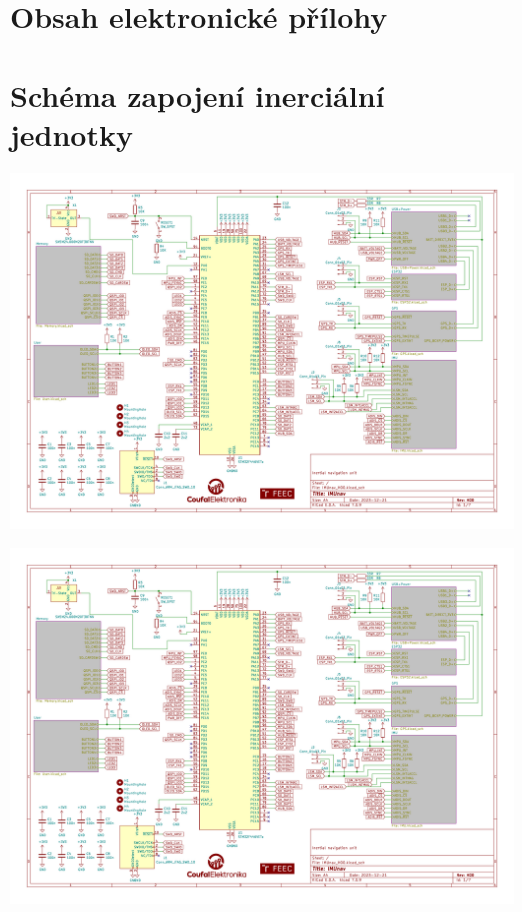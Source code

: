 
\chapter{Obsah elektronické přílohy}

\chapter{Schéma zapojení inerciální jednotky} \label{schemaApp}
\includegraphics[angle=90, page=1, width=\textwidth]{KiCad/schematic.pdf}

\includegraphics[angle=90, page=2, width=\textwidth]{KiCad/schematic.pdf}

